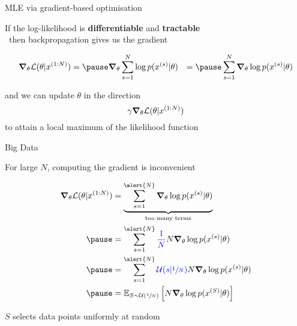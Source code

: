 \begin{frame}{MLE via gradient-based optimisation}

If the log-likelihood is {\bf differentiable} and  {\bf tractable}\\
~then backpropagation gives us the gradient
\begin{small}
\begin{equation*}
\begin{aligned}
\grad_\theta \mathcal L(\theta|x^{(1:N)}) &= \pause \grad_\theta \sum_{s=1}^N \log p(x^{(s)}|\theta) 
 &= \pause \sum_{s=1}^N \grad_\theta \log p(x^{(s)}|\theta)
\end{aligned}
\end{equation*}
\end{small}  \pause

and we can update $\theta$ in the direction
\begin{equation*}
\gamma \grad_\theta \mathcal L(\theta|x^{(1:N)})
\end{equation*}
to attain a local maximum of the likelihood function

\end{frame}


\begin{frame}{Big Data}

For large \alert{$N$}, computing the gradient is inconvenient
\begin{small}
\begin{equation*}
\begin{aligned}
\grad_\theta \mathcal L(\theta|x^{(1:N)}) &=   \underbrace{\sum_{s=1}^{\alert{N}} \grad_\theta \log p(x^{(s)}|\theta)}_{\text{too many terms}} \\ \pause
&=   \sum_{s=1}^{\alert{N}} \textcolor{blue}{\frac{1}{ N} } N \grad_\theta \log p(x^{(s)}|\theta) \\ \pause
&= \sum_{s=1}^{\alert{N}}\textcolor{blue}{\mathcal U(s|\sfrac{1}{N})}  N \grad_\theta \log p(x^{(s)}|\theta) \\ \pause
&= \mathbb E_{S\sim \mathcal U(\sfrac{1}{N})}\left[ N \grad_\theta  \log p(x^{(S)}|\theta)\right]
\end{aligned}
\end{equation*} 
\end{small}

$S$ selects data points uniformly at random



\end{frame}

